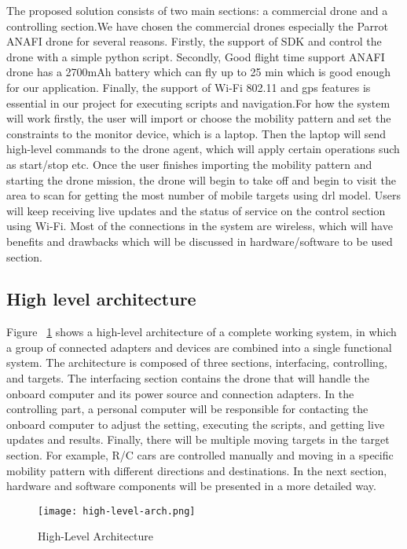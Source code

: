 \documentclass[../main.tex]{subfiles}
\begin{document}
The proposed solution consists of two main sections: a commercial drone and a controlling section.We have chosen the commercial drones especially the Parrot ANAFI drone for several reasons. Firstly, the support of SDK and control the drone with a simple python script. Secondly, Good flight time support ANAFI drone has a 2700mAh battery which can fly up to 25 min which is good enough for our application. Finally, the support of Wi-Fi 802.11 and \gls{gps} features is essential in our project for executing scripts and navigation.For how the system will work firstly, the user will import or choose the mobility pattern and set the constraints to the monitor device, which is a laptop. Then the laptop will send high-level commands to the drone agent, which will apply certain operations such as start/stop etc. Once the user finishes importing the mobility pattern and starting the drone mission, the drone will begin to take off and begin to visit the area to scan for getting the most number of mobile targets using \gls{drl} model. Users will keep receiving live updates and the status of service on the control section using Wi-Fi. Most of the connections in the system are wireless, which will have benefits and drawbacks which will be discussed in hardware/software to be used section.


\subsection{High level architecture}
Figure ~\ref{fig1:arch-fig} shows a high-level architecture of a complete working system, in which a group of connected adapters and devices are combined into a single functional system. The architecture is composed of three sections, interfacing, controlling, and targets. The interfacing section contains the drone that will handle the onboard computer and its power source and connection adapters. In the controlling part, a personal computer will be responsible for contacting the onboard computer to adjust the setting, executing the scripts, and getting live updates and results. Finally, there will be multiple moving targets in the target section. For example, R/C cars are controlled manually and moving in a specific mobility pattern with different directions and destinations. In the next section, hardware and software components will be presented in a more detailed way.

\begin{figure}[H]
	\centering
	\texttt{[image: high-level-arch.png]}
	\caption{High-Level Architecture}\label{fig1:arch-fig}
\end{figure}
\end{document}
